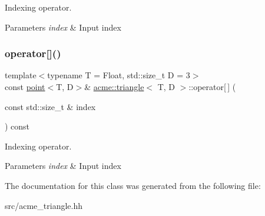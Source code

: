 Indexing operator. 


\begin{DoxyParams}{Parameters}
{\em index} & Input index \\
\hline
\end{DoxyParams}
\mbox{\label{classacme_1_1triangle_a6a3ec6159ea5b0342444fc9c735c09ed}} 
\subsubsection{\texorpdfstring{operator[]()}{operator[]()}\hspace{0.1cm}{\footnotesize\ttfamily [2/2]}}
{\footnotesize\ttfamily template$<$typename T = Float, std\+::size\+\_\+t D = 3$>$ \\
const \hyperlink{classacme_1_1point}{point}$<$T, D$>$\& \hyperlink{classacme_1_1triangle}{acme\+::triangle}$<$ T, D $>$\+::operator\mbox{[}$\,$\mbox{]} (\begin{DoxyParamCaption}\item[{const std\+::size\+\_\+t \&}]{index }\end{DoxyParamCaption}) const\hspace{0.3cm}{\ttfamily [inline]}}



Indexing operator. 


\begin{DoxyParams}{Parameters}
{\em index} & Input index \\
\hline
\end{DoxyParams}


The documentation for this class was generated from the following file\+:\begin{DoxyCompactItemize}
\item 
src/acme\+\_\+triangle.\+hh\end{DoxyCompactItemize}
